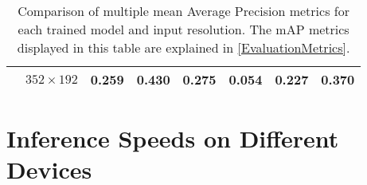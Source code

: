 \begin{table}
\begin{tabular}{|c|c|rrrrrr|}
        \cline{2-2}
                                     & \multirow{1}{*}{$352\times192$}  & 0.259 & 0.430 & 0.275 & 0.054 & 0.227 & 0.370 \\
        \hline
    \end{tabular}
    \caption{Comparison of multiple mean Average Precision metrics for each
    trained model and input resolution. The mAP metrics displayed in this table
    are explained in \autoref{EvaluationMetrics}. }
    \label{mAPTableSmall}
\end{table}










\section{Inference Speeds on Different Devices}



